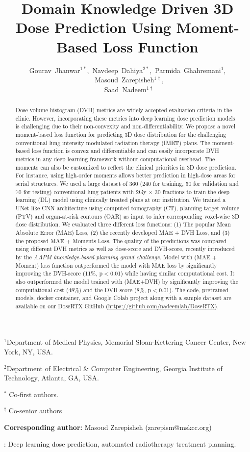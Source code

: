\documentclass[10pt]{article}
\title{Domain Knowledge Driven 3D Dose Prediction Using Moment-Based Loss Function}
\author{Gourav~Jhanwar$^{1*}$,~Navdeep~Dahiya$^{2*}$,~Parmida~Ghahremani$^{1}$, ~Masoud~Zarepisheh$^{1\dagger}$,\\~Saad~Nadeem$^{1\dagger}$}
\date{}
\begin{document}
\maketitle

{\footnotesize
\noindent
$^1$Department of Medical Physics, Memorial Sloan-Kettering Cancer Center, New York, NY, USA.

\noindent
$^2$Department of Electrical \& Computer Engineering, Georgia Institute of Technology, Atlanta, GA, USA.

\noindent
$^*$ Co-first authors.

\noindent
$^\dagger$ Co-senior authors

\noindent
\textbf{Corresponding author:} Masoud Zarepisheh (zarepism@mskcc.org)
}

\begin{abstract}
\noindent

Dose volume histogram (DVH) metrics are widely accepted evaluation criteria in the clinic. However, incorporating these metrics into deep learning dose prediction models is challenging due to their non-convexity and non-differentiability. We propose a novel moment-based loss function for predicting 3D dose distribution for the challenging conventional lung intensity modulated radiation therapy (IMRT) plans. The moment-based loss function is convex and differentiable and can easily incorporate DVH metrics in any deep learning framework without computational overhead. The moments can also be customized to reflect the clinical priorities in 3D dose prediction. For instance, using high-order moments allows better prediction in high-dose areas for serial structures. We used a large dataset of 360 (240 for training, 50 for validation and 70 for testing)  conventional lung patients with 2Gy $\times$ 30 fractions to train the deep learning (DL) model using clinically treated plans at our institution. We trained a UNet like CNN architecture using computed tomography (CT), planning target volume (PTV) and organ-at-risk contours (OAR) as input to infer corresponding voxel-wise 3D dose distribution. We evaluated three different loss functions: (1) The popular Mean Absolute Error (MAE) Loss, (2) the recently developed MAE + DVH Loss, and (3) the proposed MAE + Moments Loss. The quality of the predictions was compared using different DVH metrics as well as dose-score and DVH-score, recently introduced by the \textit{AAPM knowledge-based planning grand challenge}. Model with (MAE + Moment) loss function outperformed the model with MAE loss by significantly improving the DVH-score (11\%, p$<$0.01) while having similar computational cost. It also outperformed the model trained with (MAE+DVH) by significantly improving the computational cost (48\%) and the DVH-score (8\%, p$<$0.01). The code, pretrained models, docker container, and Google Colab project along with a sample dataset are available on our DoseRTX GitHub (\url{https://github.com/nadeemlab/DoseRTX}).

\end{abstract}
: Deep learning dose prediction, automated radiotherapy treatment planning.
\end{document}
